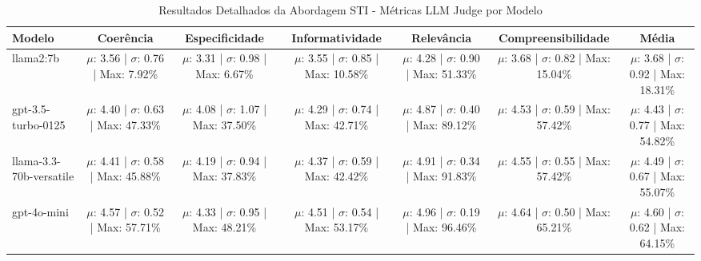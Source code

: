 \begin{table}[htbp]
\caption{Resultados Detalhados da Abordagem STI - Métricas LLM Judge por Modelo}
\label{tab:sti_llm_judge}
\centering

\begin{adjustbox}{max width=\textwidth}
\begin{tabular}{lcccccc}
\toprule
Modelo & Coerência & Especificidade & Informatividade & Relevância & Compreensibilidade & Média \\
\midrule
llama2:7b & $\mu$: 3.56 | $\sigma$: 0.76 | Max: 7.92\% & $\mu$: 3.31 | $\sigma$: 0.98 | Max: 6.67\% & $\mu$: 3.55 | $\sigma$: 0.85 | Max: 10.58\% & $\mu$: 4.28 | $\sigma$: 0.90 | Max: 51.33\% & $\mu$: 3.68 | $\sigma$: 0.82 | Max: 15.04\% & $\mu$: 3.68 | $\sigma$: 0.92 | Max: 18.31\% \\
gpt-3.5-turbo-0125 & $\mu$: 4.40 | $\sigma$: 0.63 | Max: 47.33\% & $\mu$: 4.08 | $\sigma$: 1.07 | Max: 37.50\% & $\mu$: 4.29 | $\sigma$: 0.74 | Max: 42.71\% & $\mu$: 4.87 | $\sigma$: 0.40 | Max: 89.12\% & $\mu$: 4.53 | $\sigma$: 0.59 | Max: 57.42\% & $\mu$: 4.43 | $\sigma$: 0.77 | Max: 54.82\% \\
llama-3.3-70b-versatile & $\mu$: 4.41 | $\sigma$: 0.58 | Max: 45.88\% & $\mu$: 4.19 | $\sigma$: 0.94 | Max: 37.83\% & $\mu$: 4.37 | $\sigma$: 0.59 | Max: 42.42\% & $\mu$: 4.91 | $\sigma$: 0.34 | Max: 91.83\% & $\mu$: 4.55 | $\sigma$: 0.55 | Max: 57.42\% & $\mu$: 4.49 | $\sigma$: 0.67 | Max: 55.07\% \\
gpt-4o-mini & $\mu$: 4.57 | $\sigma$: 0.52 | Max: 57.71\% & $\mu$: 4.33 | $\sigma$: 0.95 | Max: 48.21\% & $\mu$: 4.51 | $\sigma$: 0.54 | Max: 53.17\% & $\mu$: 4.96 | $\sigma$: 0.19 | Max: 96.46\% & $\mu$: 4.64 | $\sigma$: 0.50 | Max: 65.21\% & $\mu$: 4.60 | $\sigma$: 0.62 | Max: 64.15\% \\
\bottomrule
\end{tabular}
\end{adjustbox}

\end{table}